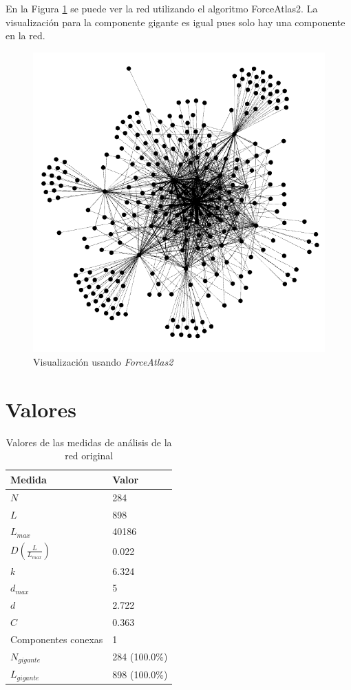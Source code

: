 En la Figura \ref{fig:visualizacion} se puede ver la red utilizando el algoritmo ForceAtlas2. La visualización para la componente gigante es igual pues solo hay una componente en la red.

\begin{figure}[H]
	\centering
	\includegraphics[width=12cm]{img/visualizacion}
	\caption{Visualización usando \textit{ForceAtlas2}}
	\label{fig:visualizacion}
\end{figure}

\section{Valores}

\begin{table}[H]
	\centering
	\caption{Valores de las medidas de análisis de la red original}
	\label{tab:medidas-original}
	\begin{tabular}{| l | l |}
		\hline
		Medida                						& Valor          \\ 
		\hline
		$N$                   						& 284            \\
		$L$                   						& 898            \\
		$L_{max}$                   				& 40186          \\
		$D (\frac{L}{L_{max}})$    					& 0.022          \\
		$k$             							& 6.324          \\
		$d_{max}$									& 5              \\
		$d$                   						& 2.722          \\
		$C$                   						& 0.363          \\
		Componentes conexas   						& 1              \\ 
		$N_{gigante}$         						& 284 (100.0\%)  \\ 
		$L_{gigante}$         						& 898 (100.0\%)  \\ 
		\hline
	\end{tabular}
\end{table}

